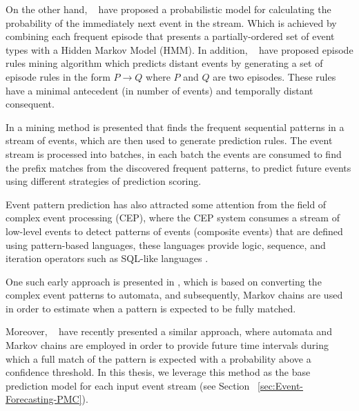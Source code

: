 \par On the other hand, ~\citet{laxman_stream_2008} have proposed a probabilistic model for calculating the probability of the immediately next event in the stream. Which is achieved by combining each frequent episode \cite{mannila1997discovery} that presents a partially-ordered set of event types with a Hidden Markov Model (HMM). In addition, ~\citet{fahed_efficient_2014} have proposed episode rules mining algorithm which predicts distant events by generating a set of episode rules in the form \(P \rightarrow Q \) where $P$ and $Q$ are two episodes. These rules have a minimal antecedent (in number of events) and temporally distant consequent.

\par In \cite{zhou_pattern_2015} a mining method is presented that finds the frequent sequential patterns in a stream of events, which are then used to generate prediction rules. The event stream is processed into batches, in each batch the events are consumed to find the prefix matches from the discovered frequent patterns, to predict future events using different strategies of prediction scoring.

\par Event pattern prediction has also attracted some attention from the field of complex event processing (CEP), where the CEP system consumes a stream of low-level events to detect patterns of events (composite events) that are defined using pattern-based languages, these languages provide logic, sequence, and iteration operators such as SQL-like languages \cite{Cugola:2012:PFI:2187671.2187677}. 
\par One such early approach is presented in \cite{muthusamy_predictive_2010}, which is based on converting the complex event patterns to automata, and subsequently, Markov chains are used in order to estimate when a pattern is expected to be fully matched. 
\par Moreover, ~\citet{alevizos2017event} have recently presented a similar approach, where automata and Markov chains are employed in order to provide future time intervals during which a full match of the pattern is expected with a probability above a confidence threshold. In this thesis, we leverage this method as the base prediction model for each input event stream (see Section ~\ref{sec:Event-Forecasting-PMC}). 